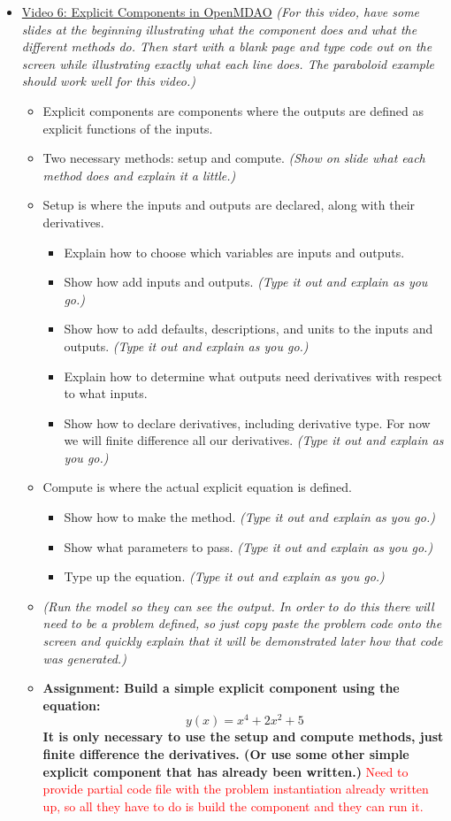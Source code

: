 \documentclass[12pt, letterpaper]{article}
\begin{document}
\begin{itemize}
	\item \underline{Video 6: Explicit Components in OpenMDAO} \textit{(For this video, have some slides at the beginning illustrating what the 				component does and what the different methods do. Then start with a blank page and type code out on the screen while illustrating exactly what each line does. The 	paraboloid example should work well for this video.)}
		\begin{itemize}
			\item Explicit components are components where the outputs are defined as explicit functions of the inputs.
			\item Two necessary methods: setup and compute. \textit{(Show on slide what each method does and explain it a little.)}
			\item Setup is where the inputs and outputs are declared, along with their derivatives.
				\begin{itemize}
					\item Explain how to choose which variables are inputs and outputs.
					\item Show how add inputs and outputs. \textit{(Type it out and explain as you go.)}
					\item Show how to add defaults, descriptions, and units to the inputs and outputs. \textit{(Type it out and explain as you go.)}
					\item Explain how to determine what outputs need derivatives with respect to what inputs.
					\item Show how to declare derivatives, including derivative type. For now we will finite difference all our derivatives. \textit{(Type it out and explain as you go.)}
				\end{itemize}
			\item Compute is where the actual explicit equation is defined.
				\begin{itemize}
					\item Show how to make the method. \textit{(Type it out and explain as you go.)}
					\item Show what parameters to pass. \textit{(Type it out and explain as you go.)}
					\item Type up the equation. \textit{(Type it out and explain as you go.)}
				\end{itemize}
			\item \textit{(Run the model so they can see the output. In order to do this there will need to be a problem defined, so just copy paste the 				problem code onto the screen and quickly explain that it will be demonstrated later how that code was generated.)}
			\item \textbf{Assignment: Build a simple explicit component using the equation: $$y(x)=x^4+2x^2+5$$ It is only necessary to use the 						setup and compute methods, just finite difference the derivatives. (Or use some other simple explicit component that has already been 						written.)} \textcolor{red}{Need to provide partial code file with the problem instantiation already written up, so all they have to do is build the component and they can run it.}
		\end{itemize}


\end{itemize}
\end{document}
